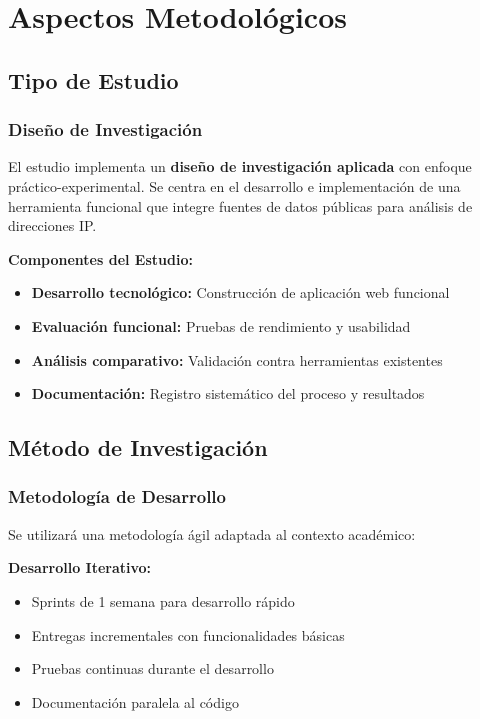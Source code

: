 \section{Aspectos Metodológicos}

\subsection{Tipo de Estudio}

\subsubsection{Diseño de Investigación}
El estudio implementa un \textbf{diseño de investigación aplicada} con enfoque práctico-experimental. Se centra en el desarrollo e implementación de una herramienta funcional que integre fuentes de datos públicas para análisis de direcciones IP.

\textbf{Componentes del Estudio:}
\begin{itemize}
    \item \textbf{Desarrollo tecnológico:} Construcción de aplicación web funcional
    \item \textbf{Evaluación funcional:} Pruebas de rendimiento y usabilidad
    \item \textbf{Análisis comparativo:} Validación contra herramientas existentes
    \item \textbf{Documentación:} Registro sistemático del proceso y resultados
\end{itemize}

\subsection{Método de Investigación}

\subsubsection{Metodología de Desarrollo}
Se utilizará una metodología ágil adaptada al contexto académico:

\textbf{Desarrollo Iterativo:}
\begin{itemize}
    \item Sprints de 1 semana para desarrollo rápido
    \item Entregas incrementales con funcionalidades básicas
    \item Pruebas continuas durante el desarrollo
    \item Documentación paralela al código
\end{itemize}

